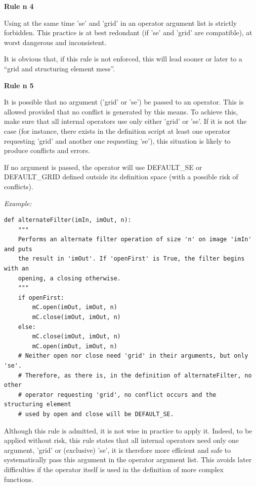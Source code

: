 \documentclass[a4paper,10pt,oneside]{article}
\begin{document}
\par
    
\textbf{Rule n\textdegree{} 4}
 
Using at the same time 'se' and 'grid' in an operator argument list is strictly 
forbidden. This practice is at best redondant (if 'se' and 'grid' are 
compatible), at worst dangerous and inconsistent.\par

It is obvious that, if this rule is not enforced, this will lead sooner or 
later to a ``grid and structuring element mess''. 

\par

\textbf{Rule n\textdegree{} 5}

It is possible that no argument ('grid' or 'se') be passed to an operator. This 
is allowed provided that no conflict is generated by this means. To achieve 
this, make sure that all internal operators use only either 'grid' or 'se'. If 
it is not the case (for instance, there exists in the definition script at 
least one operator requesting 'grid' and another one requesting 'se'), this 
situation is likely to produce conflicts and errors.

If no argument is passed, the operator will use DEFAULT\_SE or DEFAULT\_GRID 
defined outside its definition space (with a possible risk of conflicts).\par

\emph{Example:}

\lstset{language=Python}
\begin{lstlisting}
def alternateFilter(imIn, imOut, n):
    """
    Performs an alternate filter operation of size 'n' on image 'imIn' and puts
    the result in 'imOut'. If 'openFirst' is True, the filter begins with an
    opening, a closing otherwise.
    """
    if openFirst:
        mC.open(imOut, imOut, n)
        mC.close(imOut, imOut, n)
    else:
        mC.close(imOut, imOut, n)
        mC.open(imOut, imOut, n)
    # Neither open nor close need 'grid' in their arguments, but only 'se'. 
    # Therefore, as there is, in the definition of alternateFilter, no other
    # operator requesting 'grid', no conflict occurs and the structuring element
    # used by open and close will be DEFAULT_SE.
\end{lstlisting}

Although this rule is admitted, it is not wise in practice to apply it. Indeed, 
to be applied without risk, this rule states that all internal operators need 
only one argument, 'grid' or (exclusive) 'se', it is therefore more efficient 
and safe to systematically pass this argument in the operator argument list. 
This avoids later difficulties if the operator itself is used in the definition 
of more complex functions.
\end{document}

